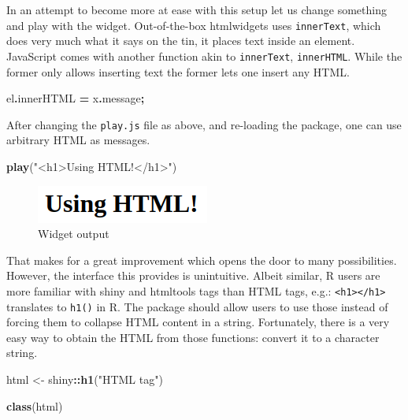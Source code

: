 \documentclass[
]{krantz}
\makeatletter
\newenvironment{Shaded}{\begin{snugshade}}{\end{snugshade}}
\newcommand{\AttributeTok}[1]{\textcolor[rgb]{0.61,0.61,0.61}{#1}}
\newcommand{\KeywordTok}[1]{\textcolor[rgb]{0.27,0.27,0.27}{\textbf{#1}}}
\newcommand{\NormalTok}[1]{#1}
\newcommand{\OperatorTok}[1]{\textcolor[rgb]{0.43,0.43,0.43}{\textbf{#1}}}
\newcommand{\StringTok}[1]{\textcolor[rgb]{0.5,0.5,0.5}{#1}}
\newenvironment{kframe}{%
\medskip{}
\setlength{\fboxsep}{.8em}
 \def\at@end@of@kframe{}%
 \ifinner\ifhmode%
  \def\at@end@of@kframe{\end{minipage}}%
  \begin{minipage}{\columnwidth}%
 \fi\fi%
 \def\FrameCommand##1{\hskip\@totalleftmargin \hskip-\fboxsep
 \colorbox{shadecolor}{##1}\hskip-\fboxsep
     \hskip-\linewidth \hskip-\@totalleftmargin \hskip\columnwidth}%
 \MakeFramed {\advance\hsize-\width
   \@totalleftmargin\z@ \linewidth\hsize
   \@setminipage}}%
 {\par\unskip\endMakeFramed%
 \at@end@of@kframe}
\renewenvironment{Shaded}{\begin{kframe}}{\end{kframe}}
\makeatother
\begin{document}
In an attempt to become more at ease with this setup let us change something and play with the widget. Out-of-the-box htmlwidgets uses \texttt{innerText}, which does very much what it says on the tin, it places text inside an element. JavaScript comes with another function akin to \texttt{innerText}, \texttt{innerHTML}. While the former only allows inserting text the former lets one insert any HTML.

\begin{Shaded}
\begin{Highlighting}[]
\NormalTok{el}\OperatorTok{.}\AttributeTok{innerHTML} \OperatorTok{=}\NormalTok{ x}\OperatorTok{.}\AttributeTok{message}\OperatorTok{;}
\end{Highlighting}
\end{Shaded}

After changing the \texttt{play.js} file as above, and re-loading the package, one can use arbitrary HTML as messages.

\begin{Shaded}
\begin{Highlighting}[]
\KeywordTok{play}\NormalTok{(}\StringTok{"\textless{}h1\textgreater{}Using HTML!\textless{}/h1\textgreater{}"}\NormalTok{)}
\end{Highlighting}
\end{Shaded}

\begin{figure}
\centering
\includegraphics{images/playground-h1.png}
\caption{Widget output}
\end{figure}

That makes for a great improvement which opens the door to many possibilities. However, the interface this provides is unintuitive. Albeit similar, R users are more familiar with shiny and htmltools \citep{R-htmltools} tags than HTML tags, e.g.: \texttt{\textless{}h1\textgreater{}\textless{}/h1\textgreater{}} translates to \texttt{h1()} in R. The package should allow users to use those instead of forcing them to collapse HTML content in a string. Fortunately, there is a very easy way to obtain the HTML from those functions: convert it to a character string.

\begin{Shaded}
\begin{Highlighting}[]
\NormalTok{html \textless{}{-}}\StringTok{ }\NormalTok{shiny}\OperatorTok{::}\KeywordTok{h1}\NormalTok{(}\StringTok{"HTML tag"}\NormalTok{)}

\KeywordTok{class}\NormalTok{(html)}
\end{Highlighting}
\end{Shaded}
\end{document}
